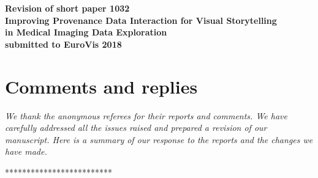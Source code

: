 \documentclass{article}
\newcommand{\cre}[1]{{\color{red}#1}}
\begin{document}
	\sloppy
	
	\begin{center}
		\bf
		\large
		Revision of short paper 1032\\[4pt]
		\vspace{2ex}
		\Large Improving Provenance Data Interaction for Visual Storytelling\\ in Medical Imaging Data Exploration\\[4pt]
		\vspace{2ex}
		{\large submitted to EuroVis 2018}
	\end{center}
	
	\section*{Comments and replies}
	
	{\em We thank the anonymous referees for their reports and comments. We have carefully addressed all the issues raised and prepared a revision of our manuscript. Here is a summary of our response to the reports and the changes we have made.}
	
	\vspace*{1ex}
	
	\begin{center}
		*************************
	\end{center}
	
	
	
\end{document}
